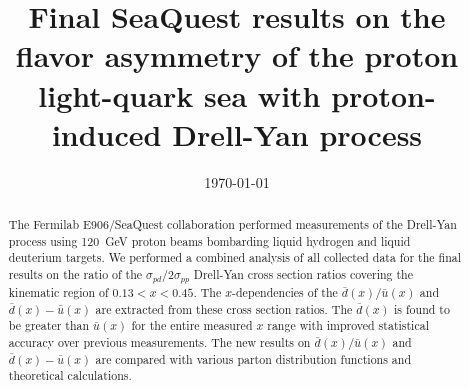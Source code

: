 \documentclass[reprint,aps,unsortedaddress,superscriptaddress,prl,floatfix,showpacs,linenumbers,final]{revtex4-2}
\begin{document}
\title{Final SeaQuest results on the flavor asymmetry of the proton light-quark sea with proton-induced Drell-Yan process}


\date{\today}

\begin{abstract}
	The Fermilab E906/SeaQuest collaboration performed measurements of the Drell-Yan process using
	\SI{120}{\GeV} proton beams bombarding liquid hydrogen and liquid deuterium targets.
	We performed a combined analysis of all collected data for the final results on the ratio of the $\sigma_{pd}/2\sigma_{pp}$ Drell-Yan cross
	section ratios covering the kinematic region of $0.13 < x < 0.45$.
	The $x$-dependencies of the $\bar{d}\left(x\right) / \bar{u}\left(x\right)$ and $\bar{d}\left(x\right) - \bar{u}\left(x\right)$
	are extracted from these cross section ratios.
	The $\bar{d}\left(x\right)$ is found to be greater than $\bar{u}\left(x\right)$ for the entire measured $x$
	range with improved statistical accuracy over previous measurements.
	The new results on $\bar{d}\left(x\right) / \bar{u}\left(x\right)$ and $\bar{d}\left(x\right) - \bar{u}\left(x\right)$
	are compared with various parton distribution functions and theoretical calculations.
\end{abstract}


\maketitle

\end{document}
